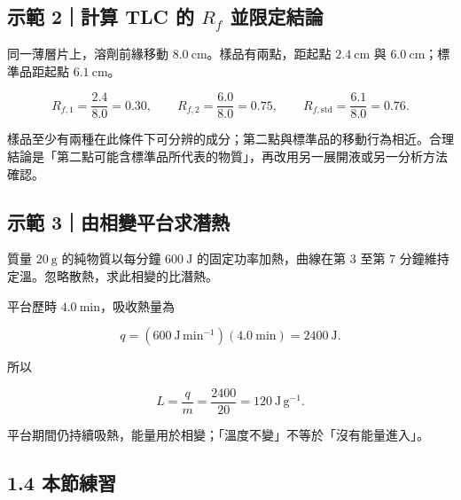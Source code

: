 \documentclass[11pt,a4paper]{article}
\begin{document}
\begin{HandoutWorkedExample}

\subsection{\texorpdfstring{示範 2｜計算 TLC 的 \(R_f\) 並限定結論}{示範 2｜計算 TLC 的 R\_f 並限定結論}}\label{ux793aux7bc4-2ux8a08ux7b97-tlc-ux7684-r_f-ux4e26ux9650ux5b9aux7d50ux8ad6}

同一薄層片上，溶劑前緣移動 \(8.0\ \mathrm{cm}\)。樣品有兩點，距起點 \(2.4\ \mathrm{cm}\) 與 \(6.0\ \mathrm{cm}\)；標準品距起點 \(6.1\ \mathrm{cm}\)。

\[
R_{f,1}=\frac{2.4}{8.0}=0.30,\qquad
R_{f,2}=\frac{6.0}{8.0}=0.75,\qquad
R_{f,\mathrm{std}}=\frac{6.1}{8.0}=0.76.
\]

樣品至少有兩種在此條件下可分辨的成分；第二點與標準品的移動行為相近。合理結論是「第二點可能含標準品所代表的物質」，再改用另一展開液或另一分析方法確認。

\end{HandoutWorkedExample}

\begin{HandoutWorkedExample}

\subsection{示範 3｜由相變平台求潛熱}\label{ux793aux7bc4-3ux7531ux76f8ux8b8aux5e73ux53f0ux6c42ux6f5bux71b1}

質量 \(20\ \mathrm g\) 的純物質以每分鐘 \(600\ \mathrm J\) 的固定功率加熱，曲線在第 3 至第 7 分鐘維持定溫。忽略散熱，求此相變的比潛熱。

平台歷時 \(4.0\ \mathrm{min}\)，吸收熱量為

\[
q=(600\ \mathrm{J\,min^{-1}})(4.0\ \mathrm{min})=2400\ \mathrm J.
\]

所以

\[
L=\frac qm=\frac{2400}{20}=120\ \mathrm{J\,g^{-1}}.
\]

平台期間仍持續吸熱，能量用於相變；「溫度不變」不等於「沒有能量進入」。

\end{HandoutWorkedExample}

\subsection{1.4 本節練習}\label{ux672cux7bc0ux7df4ux7fd2}
\end{document}

